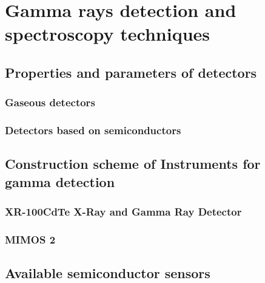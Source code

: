 
\chapter{Gamma rays detection and spectroscopy techniques}


\section{Properties and parameters of detectors}
\subsection{Gaseous detectors}

\subsection{Detectors based on semiconductors}


\section{Construction scheme of Instruments for gamma detection}


\subsection{XR-100CdTe X-Ray and Gamma Ray Detector}

\subsection{MIMOS 2}





\section{Available semiconductor sensors}





